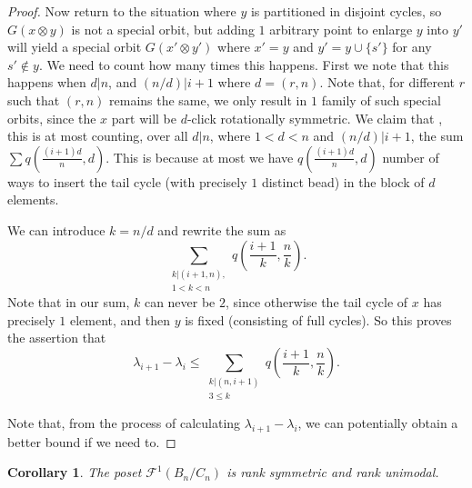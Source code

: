 \documentclass{amsart}
\newtheorem{cor}[thm]{Corollary}
\theoremstyle{remark}
\newcommand{\dstyle}{\displaystyle}
\begin{document}
\begin{proof}
Now return to the situation where $y$ is partitioned in disjoint cycles, so $G{(x \otimes y)}$ is not a special orbit, but adding $1$ arbitrary point to enlarge $y$ into $y'$ will yield a special orbit $G{(x' \otimes y')}$ where $x' = y$ and $y' = y \cup \{s'\}$ for any $s' \notin y$. We need to count how many times this happens.  First we note that this happens when $d | n$, and $(n/d) | i+1$ where $d = (r, n)$. Note that, for different $r$ such that $(r, n)$ remains the same, we only result in $1$ family of such special orbits, since the $x$ part will be $d$-click rotationally symmetric. We claim that , this is at most counting,  over all $d | n$, where $1 < d < n$ and $(n/d) | i+1 $, the sum $\dstyle \sum q \left(\frac{(i+1)d}{n}, d\right)$. This is because at most we have $q(\frac{(i+1)d}{n}, d)$ number of ways to insert the tail cycle (with precisely $1$ distinct bead) in the block of $d$ elements. 

We can introduce $k = n/d$  and rewrite the sum as 
$$\sum_{\substack{k | (i+1, n), \\ 1 < k < n}} q\left(\frac{i+1}{k}, \frac{n}{k}\right).$$ Note that in our sum, $k$ can never be $2$, since otherwise the tail cycle of $x$ has precisely $1$ element, and then $y$ is fixed (consisting of full cycles). So this proves the assertion that $$\lambda_{i+1} - \lambda_i \le \sum_{\substack{k | (n , i+1) \\ 3 \le k }} q (\frac{i+1}{k}, \frac{n}{k}). $$ 
 
Note that, from the process of calculating $\lambda_{i+1} - \lambda_{i}$, we can potentially obtain a better bound   if we need to. 
\end{proof}

\begin{cor}{\label{cor:cyclic_unimodal}} 
The poset $\mathcal F^1(B_n/C_n)$ is rank symmetric and rank unimodal.
\end{cor}
\end{document}
